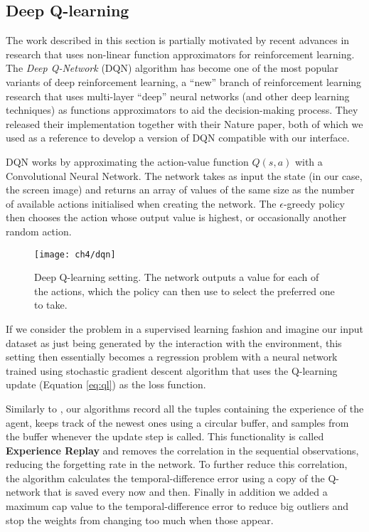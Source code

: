 \subsection{Deep Q-learning}

The work described in this section is partially motivated by recent advances in
research that uses non-linear function approximators for reinforcement learning. The
\emph{Deep Q-Network} (DQN) algorithm \citep{mnih2013playing, mnih2015human} has
become one of the most popular variants of deep reinforcement learning, a
``new'' branch of reinforcement learning research that uses multi-layer ``deep''
neural networks (and other deep learning techniques) as functions approximators
to aid the decision-making process. They released their implementation together
with their Nature paper, both of which we used as a reference to develop a
version of DQN compatible with our interface.

DQN works by approximating the action-value function $Q(s, a)$ with a
Convolutional Neural Network. The network takes as input the state (in our case,
the screen image) and returns an array of values of the same size as the number
of available actions initialised when creating the network. The
$\epsilon$-greedy policy then chooses the action whose output value is highest,
or occasionally another random action.

\begin{figure}[h]
    \centering
    \texttt{[image: ch4/dqn]}
    \caption{Deep Q-learning setting. The network outputs a value for each of
      the actions, which the policy can then use to select the preferred
      one to take.}
    \label{fig:dqn}
\end{figure}

If we consider the problem in a supervised learning fashion and imagine our
input dataset as just being generated by the interaction with the environment,
this setting then essentially becomes a regression problem with a neural
network trained using stochastic gradient descent algorithm that uses the
Q-learning update (Equation \ref{eq:ql}) as the loss function.


Similarly to \cite{mnih2013playing}, our algorithms record all the tuples
containing the experience of the agent, keeps track of the newest ones using a
circular buffer, and samples from the buffer whenever the update step is called.
This functionality is called \textbf{Experience Replay} and removes the
correlation in the sequential observations, reducing the forgetting rate in the
network. To further reduce this correlation, the algorithm calculates the
temporal-difference error using a copy of the Q-network that is saved every now
and then. Finally in addition we added a maximum cap value to the
temporal-difference error to reduce big outliers and stop the weights from
changing too much when those appear.

